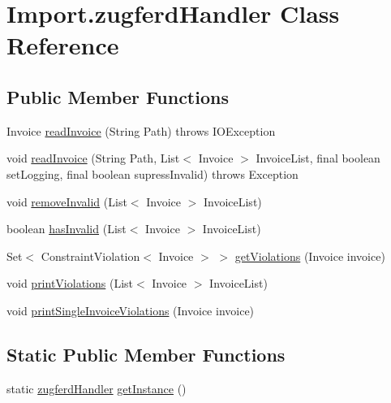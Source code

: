 \hypertarget{class_import_1_1zugferd_handler}{}\section{Import.\+zugferd\+Handler Class Reference}
\label{class_import_1_1zugferd_handler}
\subsection*{Public Member Functions}
\begin{DoxyCompactItemize}
\item 
Invoice \hyperlink{class_import_1_1zugferd_handler_aea79c23595f003c943e908c95276ecf9}{read\+Invoice} (String Path)  throws I\+O\+Exception
\item 
void \hyperlink{class_import_1_1zugferd_handler_a139f15033905c9e3a5d5fada5fb9e862}{read\+Invoice} (String Path, List$<$ Invoice $>$ Invoice\+List, final boolean set\+Logging, final boolean supress\+Invalid)  throws Exception 
\item 
void \hyperlink{class_import_1_1zugferd_handler_aa5fbab8b4a7835f2b13167452f9d17db}{remove\+Invalid} (List$<$ Invoice $>$ Invoice\+List)
\item 
boolean \hyperlink{class_import_1_1zugferd_handler_a6999d186193b120650a5d24a49d10c6c}{has\+Invalid} (List$<$ Invoice $>$ Invoice\+List)
\item 
Set$<$ Constraint\+Violation$<$ Invoice $>$ $>$ \hyperlink{class_import_1_1zugferd_handler_acf26740b73f820812fadb01ccf712dd2}{get\+Violations} (Invoice invoice)
\item 
void \hyperlink{class_import_1_1zugferd_handler_ae8ae1fcc05ebddf4d2b53c8daeda7b00}{print\+Violations} (List$<$ Invoice $>$ Invoice\+List)
\item 
void \hyperlink{class_import_1_1zugferd_handler_aadb33b773805373add19d92eb713831b}{print\+Single\+Invoice\+Violations} (Invoice invoice)
\end{DoxyCompactItemize}
\subsection*{Static Public Member Functions}
\begin{DoxyCompactItemize}
\item 
static \hyperlink{class_import_1_1zugferd_handler}{zugferd\+Handler} \hyperlink{class_import_1_1zugferd_handler_ad3acd84340c8a5fcb2c01a2636979786}{get\+Instance} ()
\end{DoxyCompactItemize}


